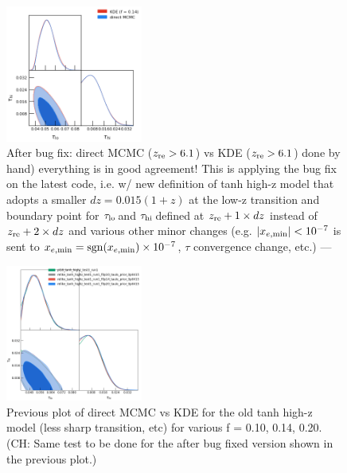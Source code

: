 \documentclass[prd,amsmath,amssymb,floatfix,superscriptaddress,nofootinbib]{revtex4-1}
\newcommand{\tauhi}{$\tau_{\rm hi}\,$}
\newcommand{\taulo}{$\tau_{\rm lo}\,$}
\begin{document}
\begin{figure}
\includegraphics[width=0.4\textwidth]{results/cosmomc_kde/pl18_tanh_highz_test5_run1_vs_relike_tanh_highz_test8_run9_f0p14_taulo_prior_0p03_zre_prior_6p1_taulo_prior_0p0_tri.png}
\caption{After bug fix: direct MCMC ($z_{\rm re} > 6.1$) vs KDE ($z_{\rm re} > 6.1$) done by hand) everything is in good agreement! This is applying the bug fix on the latest code, i.e. w/ new definition of tanh high-z model that adopts a smaller $dz = 0.015 (1+z)$ at the low-z transition and boundary point for \taulo and \tauhi defined at $z_{\rm re} + 1 \times dz$ instead of $z_{\rm re} + 2 \times dz$ and various other minor changes (e.g. $|x_{e,\rm min}|<10^{-7}$ is sent to $x_{e,\rm min} = \mathrm{sgn}(x_{e,\rm min}) \times 10^{-7}$, $\tau$ convergence change, etc.) —  
}
\label{fig:}
\end{figure}


\begin{figure}
\includegraphics[width=0.4\textwidth]{results/cosmomc_kde/getdist_smoothing_test/pl18_tanh_highz_test3_run1_vs_relike_tanh_highz_test1_run1_f0p10_taulo_prior_0p0415_0p10_0p14_0p20_tri_from_getdist_chains_smooth_scale_1D_-1_num_bins_1D_100.png}
\caption{Previous plot of direct MCMC vs KDE for the old tanh high-z model (less sharp transition, etc) for various f = 0.10, 0.14, 0.20. (CH: Same test to be done for the after bug fixed version shown in the previous plot.)
}
\label{fig:}
\end{figure}
\end{document}

